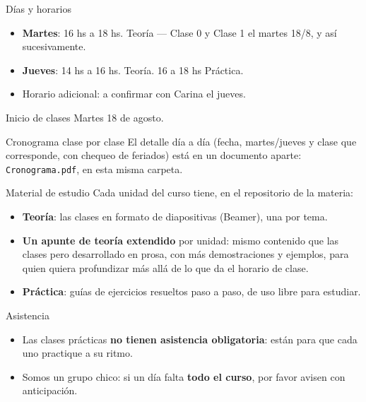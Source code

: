 \documentclass[aspectratio=169,11pt]{beamer}
\begin{document}
\begin{frame}{Días y horarios}
\begin{itemize}
\item \textbf{Martes}: 16 hs a 18 hs. Teoría — Clase 0 y Clase 1 el martes 18/8, y así sucesivamente.
\item \textbf{Jueves}: 14 hs a 16 hs. Teoría. 16 a 18 hs Práctica.
\item Horario adicional: a confirmar con Carina el jueves.
\end{itemize}

\vspace{0.5em}
\begin{alertblock}{Inicio de clases}
Martes 18 de agosto.
\end{alertblock}

\begin{block}{Cronograma clase por clase}
El detalle día a día (fecha, martes/jueves y clase que corresponde, con chequeo de feriados) está en un documento aparte: \texttt{Cronograma.pdf}, en esta misma carpeta.
\end{block}
\end{frame}

\begin{frame}{Material de estudio}
Cada unidad del curso tiene, en el repositorio de la materia:
\begin{itemize}
\item \textbf{Teoría}: las clases en formato de diapositivas (Beamer), una por tema.
\item \textbf{Un apunte de teoría extendido} por unidad: mismo contenido que las clases pero desarrollado en prosa, con más demostraciones y ejemplos, para quien quiera profundizar más allá de lo que da el horario de clase.
\item \textbf{Práctica}: guías de ejercicios resueltos paso a paso, de uso libre para estudiar.
\end{itemize}
\end{frame}

\begin{frame}{Asistencia}
\begin{itemize}
\item Las clases prácticas \textbf{no tienen asistencia obligatoria}: están para que cada uno practique a su ritmo.
\item Somos un grupo chico: si un día falta \textbf{todo el curso}, por favor avisen con anticipación.
\end{itemize}
\end{frame}
\end{document}
